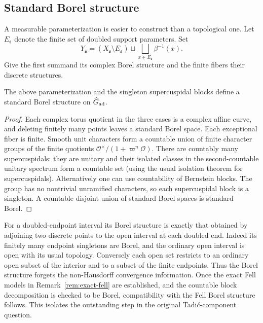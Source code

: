 \subsection{Standard Borel structure}\label{subsec:standard-borel}
A measurable parameterization is easier to construct than a topological one. Let $E_{\mathfrak s}$ denote the finite set of doubled support parameters. Set
\[Y_{\mathfrak s}=(X_{\mathfrak s}\setminus E_{\mathfrak s})\sqcup\bigsqcup_{x\in E_{\mathfrak s}}\beta^{-1}(x).\]
Give the first summand its complex Borel structure and the finite fibers their discrete structures.
\begin{proposition}\label{prop:borel-model}
The above parameterization and the singleton supercuspidal blocks define a standard Borel structure on $\widehat G_{\rm ad}$.
\end{proposition}
\begin{proof}
Each complex torus quotient in the three cases is a complex affine curve, and deleting finitely many points leaves a standard Borel space. Each exceptional fiber is finite. Smooth unit characters form a countable union of finite character groups of the finite quotients $\mathcal O^\times/(1+\varpi^n\mathcal O)$. There are countably many supercuspidals: they are unitary and their isolated classes in the second-countable unitary spectrum form a countable set (using the usual isolation theorem for supercuspidals). Alternatively one can use countability of Bernstein blocks. The group has no nontrivial unramified characters, so each supercuspidal block is a singleton. A countable disjoint union of standard Borel spaces is standard Borel.
\end{proof}
For a doubled-endpoint interval its Borel structure is exactly that obtained by adjoining two discrete points to the open interval at each doubled end. Indeed its finitely many endpoint singletons are Borel, and the ordinary open interval is open with its usual topology. Conversely each open set restricts to an ordinary open subset of the interior and to a subset of the finite endpoints. Thus the Borel structure forgets the non-Hausdorff convergence information. Once the exact Fell models in Remark~\ref{rem:exact-fell} are established, and the countable block decomposition is checked to be Borel, compatibility with the Fell Borel structure follows. This isolates the outstanding step in the original Tadi\'c-component question.

